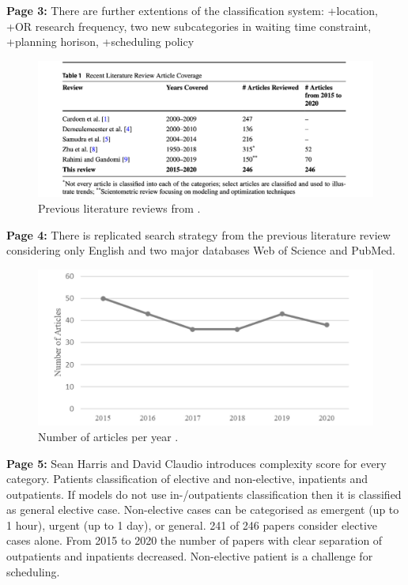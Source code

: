     \textbf{Page 3:}
    There are further extentions of the classification system: +location, +OR research frequency, two new subcategories in waiting time constraint, +planning horison, +scheduling policy
    \begin{figure}[H]
        \centering
        \includegraphics[width=1\textwidth]{figures/0002_SR02US22/fig1.png}
        \caption{Previous literature reviews from \cite{x079}.}
        \label{fig1:SR02US22}
    \end{figure}
    
    \textbf{Page 4:}
    There is replicated search strategy from the previous literature review considering only English and two major databases Web of Science and PubMed.
    \begin{figure}[H]
        \centering
        \includegraphics[width=1\textwidth]{figures/0002_SR02US22/fig2.png}
        \caption{Number of articles per year \cite{x079}.}
        \label{fig2:SR02US22}
    \end{figure}
    
    \textbf{Page 5:}
    Sean Harris and David Claudio introduces complexity score for every category. Patients classification of elective and non-elective, inpatients and outpatients. If models do not use in-/outpatients classification then it is classified as general elective case. Non-elective cases can be categorised as emergent (up to 1 hour), urgent (up to 1 day), or general. 241 of 246 papers consider elective cases alone. From 2015 to 2020 the number of papers with clear separation of outpatients and inpatients decreased. Non-elective patient is a challenge for scheduling.

